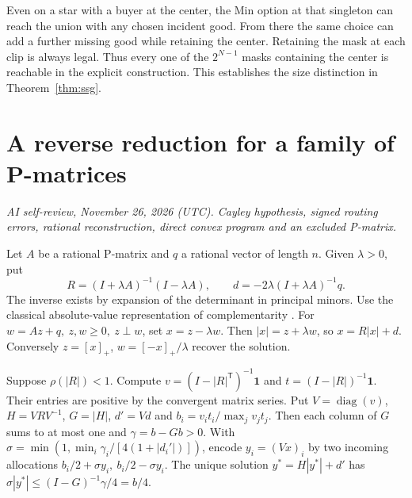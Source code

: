 \documentclass[11pt,oneside,openany,notitlepage]{report}
\newcommand{\reviewdate}{November 26, 2026 (UTC)}
\newcommand{\reviewmark}[1]{\par\nopagebreak[4]\noindent
  {\footnotesize\itshape AI self-review, \reviewdate. #1\par}\nobreak\smallskip}
\begin{document}
Even on a star with a buyer at the center, the Min option at that
singleton can reach the union with any chosen incident good. From there
the same choice can add a further missing good while retaining the
center. Retaining the mask at each clip is always legal. Thus every one
of the \(2^{N-1}\) masks containing the center is reachable in the
explicit construction. This establishes the size distinction in
Theorem~\ref{thm:ssg}.

\chapter{A reverse reduction for a family of P-matrices}\label{sec:cayley}
\reviewmark{Cayley hypothesis, signed routing errors, rational reconstruction, direct convex program and an excluded P-matrix.}

Let \(A\) be a rational P-matrix and \(q\) a rational vector of length
\(n\). Given \(\lambda>0\), put
\[
 R=(I+\lambda A)^{-1}(I-\lambda A),\qquad
 d=-2\lambda(I+\lambda A)^{-1}q .
\]
The inverse exists by expansion of the determinant in principal minors.
Use the classical absolute-value representation of complementarity
\cite{gb}. For \(w=Az+q,\ z,w\ge0,\ z\perp w\), set \(x=z-\lambda w\).
Then \(|x|=z+\lambda w\), so \(x=R|x|+d\). Conversely
\(z=[x]_+\), \(w=[-x]_+/\lambda\) recover the solution.

Suppose \(\rho(|R|)<1\). Compute
\(v=(I-|R|^{\mathsf T})^{-1}\mathbf1\) and
\(t=(I-|R|)^{-1}\mathbf1\). Their entries are positive by the convergent
matrix series. Put \(V=\operatorname{diag}(v)\), \(H=VRV^{-1}\),
\(G=|H|\), \(d'=Vd\) and \(b_i=v_it_i/\max_j v_jt_j\). Then each
column of \(G\) sums to at most one and \(\gamma=b-Gb>0\). With
\(\sigma=\min(1,\min_i\gamma_i/[4(1+|d_i'|)])\), encode \(y_i=(Vx)_i\)
by two incoming allocations \(b_i/2+\sigma y_i,\ b_i/2-\sigma y_i\).
The unique solution \(y^*=H|y^*|+d'\) has
\(\sigma|y^*|\le(I-G)^{-1}\gamma/4=b/4\).
\end{document}
